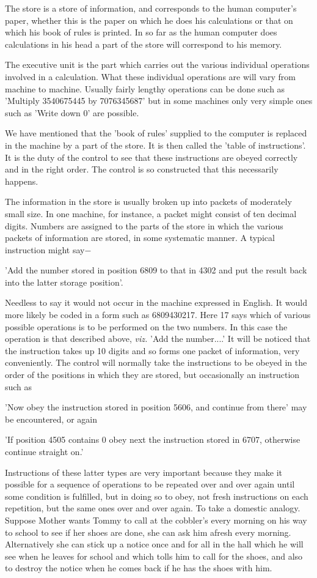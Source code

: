 \documentclass[12pt]{article}
\begin{document}
    The store is a store of information, and corresponds to the human computer's paper, whether this is the paper on which he does his calculations or that on which his book of rules is printed. In so far as the human computer does calculations in his head a part of the store will correspond to his memory.

    The executive unit is the part which carries out the various individual operations involved in a calculation. What these individual operations are will vary from machine to machine. Usually fairly lengthy operations can be done such as 'Multiply 3540675445 by 7076345687' but in some machines only very simple ones such as 'Write down 0' are possible.

    We have mentioned that the 'book of rules' supplied to the computer is replaced in the machine by a part of the store. It is then called the 'table of instructions'. It is the duty of the control to see that these instructions are obeyed correctly and in the right order. The control is so constructed that this necessarily happens.

    The information in the store is usually broken up into packets of moderately small size. In one machine, for instance, a packet might consist of ten decimal digits. Numbers are assigned to the parts of the store in which the various packets of information are stored, in some systematic manner. A typical instruction might say$-$

    'Add the number stored in position 6809 to that in 4302 and put the result back into the latter storage position'.

    Needless to say it would not occur in the machine expressed in English. It would more likely be coded in a form such as 6809430217. Here 17 says which of various possible operations is to be performed on the two numbers. In this case the operation is that described above, \textit{viz.} 'Add the number....' It will be noticed that the instruction takes up 10 digits and so forms one packet of information, very conveniently. The control will normally take the instructions to be obeyed in the order of the positions in which they are stored, but occasionally an instruction such as

    'Now obey the instruction stored in position 5606, and continue from there' may be encountered, or again

    'If position 4505 contains 0 obey next the instruction stored in 6707, otherwise continue straight on.'

    Instructions of these latter types are very important because they make it possible for a sequence of operations to be repeated over and over again until some condition is fulfilled, but in doing so to obey, not fresh instructions on each repetition, but the same ones over and over again. To take a domestic analogy. Suppose Mother wants Tommy to call at the cobbler's every morning on his way to school to see if her shoes are done, she can ask him afresh every morning. Alternatively she can stick up a notice once and for all in the hall which he will see when he leaves for school and which tolls him to call for the shoes, and also to destroy the notice when he comes back if he has the shoes with him.
\end{document}
